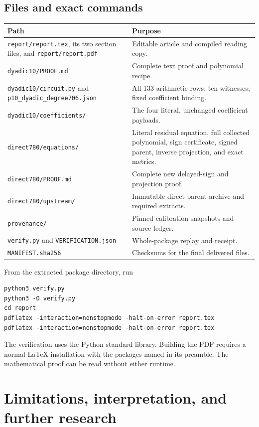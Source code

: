 \documentclass[11pt,letterpaper]{article}
\theoremstyle{definition}
\theoremstyle{remark}
\numberwithin{equation}{section}
\begin{document}
\subsection{Files and exact commands}

\begin{longtable}{@{}>{\raggedright\arraybackslash}p{}>{\raggedright\arraybackslash}p{}@{}}
\toprule
Path & Purpose\\
\midrule
\endhead
\texttt{report/report.tex}, its two section files, and
\texttt{report/report.pdf} & Editable article and compiled reading copy.\\
\texttt{dyadic10/PROOF.md} & Complete text proof and polynomial recipe.\\
\texttt{dyadic10/circuit.py} and
\texttt{p10\_dyadic\_degree706.json} & All 133 arithmetic rows; ten witnesses;
fixed coefficient binding.\\
\texttt{dyadic10/coefficients/} & The four literal, unchanged coefficient payloads.\\
\texttt{direct780/equations/} & Literal residual equation, full collected polynomial,
sign certificate, signed parent, inverse projection, and exact metrics.\\
\texttt{direct780/PROOF.md} & Complete new delayed-sign and projection proof.\\
\texttt{direct780/upstream/} & Immutable direct parent archive and required extracts.\\
\texttt{provenance/} & Pinned calibration snapshots and source ledger.\\
\texttt{verify.py} and \texttt{VERIFICATION.json} & Whole-package replay and receipt.\\
\texttt{MANIFEST.sha256} & Checksums for the final delivered files.\\
\bottomrule
\end{longtable}

From the extracted package directory, run
\begin{verbatim}
python3 verify.py
python3 -O verify.py
cd report
pdflatex -interaction=nonstopmode -halt-on-error report.tex
pdflatex -interaction=nonstopmode -halt-on-error report.tex
\end{verbatim}
The verification uses the Python standard library. Building the PDF
requires a normal LaTeX installation with the packages named in its
preamble. The mathematical proof can be read without either runtime.

\section{Limitations, interpretation, and further research}
\label{sec:further}
\end{document}
